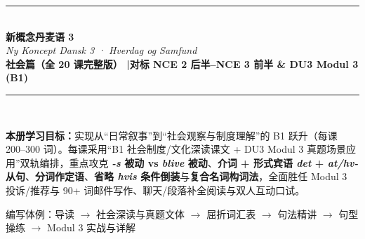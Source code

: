 \documentclass[11pt, a4paper]{ctexart}
\begin{document}
\begin{titlepage}
  \centering
  \vspace*{2.5cm}
  {\color{NCDRed}\rule{\linewidth}{2.5pt}}\\[1.2cm]
  {\fontsize{34}{40}\selectfont\bfseries\color{NCDNavy} 新概念丹麦语 3}\\[0.5cm]
  {\huge\itshape\color{NCDTeal} Ny Koncept Dansk 3 · Hverdag og Samfund}\\[0.8cm]
  {\large\bfseries\color{NCDGray} 社会篇（全 20 课完整版） \quad|\quad 对标 NCE 2 后半--NCE 3 前半 \& DU3 Modul 3 (B1)}\\[1.2cm]
  {\color{NCDRed}\rule{\linewidth}{2.5pt}}\\[2cm]

  \begin{tcolorbox}[
    colback=NCDBgBlue,
    colframe=NCDNavy,
    width=0.90\linewidth,
    arc=4pt,
    boxrule=0.8pt,
    left=14pt, right=14pt, top=12pt, bottom=12pt
  ]
    \textbf{\color{NCDNavy}本册学习目标：}实现从“日常叙事”到“社会观察与制度理解”的 B1 跃升（每课 200--300 词）。每课采用“B1 社会制度/文化深读课文 + DU3 Modul 3 真题场景应用”双轨编排，重点攻克 \textbf{\textit{-s} 被动 vs \textit{blive} 被动}、\textbf{介词 + 形式宾语 \textit{det} + \textit{at/hv-} 从句}、\textbf{分词作定语}、\textbf{省略 \textit{hvis} 条件倒装}与\textbf{复合名词构词法}，全面胜任 Modul 3 投诉/推荐与 90+ 词邮件写作、聊天/段落补全阅读与双人互动口试。
  \end{tcolorbox}

  \vfill
  {\large\color{NCDGray} 编写体例：导读 $\rightarrow$ 社会深读与真题文体 $\rightarrow$ 屈折词汇表 $\rightarrow$ 句法精讲 $\rightarrow$ 句型操练 $\rightarrow$ Modul 3 实战与详解}
\end{titlepage}

\tableofcontents
\clearpage








\end{document}
